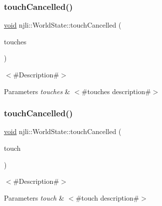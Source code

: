 \subsubsection{\texorpdfstring{touch\+Cancelled()}{touchCancelled()}\hspace{0.1cm}{\footnotesize\ttfamily [1/2]}}
{\footnotesize\ttfamily \mbox{\hyperlink{_thread_8h_af1e856da2e658414cb2456cb6f7ebc66}{void}} njli\+::\+World\+State\+::touch\+Cancelled (\begin{DoxyParamCaption}\item[{\mbox{\hyperlink{classnjli_1_1_device_touch}{Device\+Touch}} $\ast$$\ast$}]{touches }\end{DoxyParamCaption})}

$<$\#\+Description\#$>$


\begin{DoxyParams}{Parameters}
{\em touches} & $<$\#touches description\#$>$ \\
\hline
\end{DoxyParams}
\mbox{\label{classnjli_1_1_world_state_a2c8b22b216dc3652fe8f5185365a6a20}} 
\subsubsection{\texorpdfstring{touch\+Cancelled()}{touchCancelled()}\hspace{0.1cm}{\footnotesize\ttfamily [2/2]}}
{\footnotesize\ttfamily \mbox{\hyperlink{_thread_8h_af1e856da2e658414cb2456cb6f7ebc66}{void}} njli\+::\+World\+State\+::touch\+Cancelled (\begin{DoxyParamCaption}\item[{const \mbox{\hyperlink{classnjli_1_1_device_touch}{Device\+Touch}} \&}]{touch }\end{DoxyParamCaption})}

$<$\#\+Description\#$>$


\begin{DoxyParams}{Parameters}
{\em touch} & $<$\#touch description\#$>$ \\
\hline
\end{DoxyParams}
\mbox{\label{classnjli_1_1_world_state_a965f7226e2cbe97c315cdab6000ad181}} 
